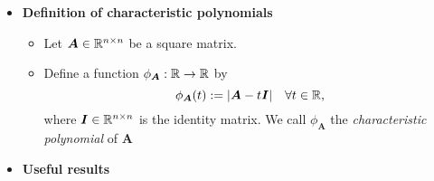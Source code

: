 \documentclass[12pt,a4paper]{article}
\begin{document}
\begin{itemize}

\item \textbf{Definition of characteristic polynomials}
  \begin{itemize}
  \item Let $\bm{A}\in \mathbb{R}^{n\times n}$ be a square matrix.
  \item Define a function $\phi_{\bm{A}}:\mathbb{R} \to \mathbb{R}$ by
    \begin{equation}\nonumber%
      \phi_{\bm{A}}(t) := |\bm{A}-t\bm{I}| \quad \forall t\in \R,
    \end{equation}
    where $\bm{I}\in \mathbb{R}^{n\times n}$ is the identity matrix.
    We call $\phi_{\bm{A}}$ the \emph{characteristic polynomial} of $\bm{A}$
  \end{itemize}

\item \textbf{Useful results}


\end{itemize}
\end{document}
